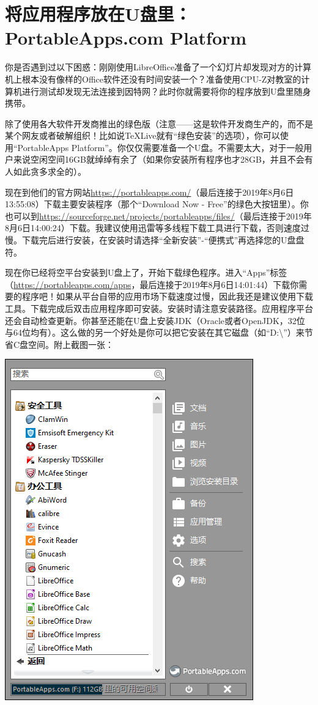 \section{将应用程序放在U盘里：PortableApps.com Platform}
你是否遇到过以下困惑：刚刚使用LibreOffice准备了一个幻灯片却发现对方的计算机上根本没有像样的Office软件还没有时间安装一个？准备使用CPU-Z对教室的计算机进行测试却发现无法连接到因特网？此时你就需要将你的程序放到U盘里随身携带。\par
除了使用各大软件开发商推出的绿色版（注意——这是软件开发商生产的，而不是某个网友或者破解组织！比如说TeXLive就有“绿色安装”的选项），你可以使用“PortableApps Platform”。你仅仅需要准备一个U盘。不需要太大，对于一般用户来说空闲空间16GB就绰绰有余了（如果你安装所有程序也才28GB，并且不会有人如此贪多求全的）。\par
现在到他们的官方网站\url{https://portableapps.com/}（最后连接于2019年8月6日13:55:08）下载主要安装程序（那个“Download Now - Free”的绿色大按钮里）。你也可以到\url{https://sourceforge.net/projects/portableapps/files/}（最后连接于2019年8月6日14:00:24）下载。我建议使用迅雷等多线程下载工具进行下载，否则速度过慢。下载完后进行安装，在安装时请选择“全新安装”-“便携式”再选择您的U盘盘符。\par
现在你已经将空平台安装到U盘上了，开始下载绿色程序。进入“Apps”标签（\url{https://portableapps.com/apps}，最后连接于2019年8月6日14:01:44）下载你需要的程序吧！如果从平台自带的应用市场下载速度过慢，因此我还是建议使用下载工具。下载完成后双击应用程序即可安装。安装时请注意安装路径。应用程序平台还会自动检查更新。你甚至还能在U盘上安装JDK（Oracle或者OpenJDK，32位与64位均有）。这么做的另一个好处是你可以把它安装在其它磁盘（如“D:\textbackslash”）来节省C盘空间。附上截图一张：
\begin{center}
	\includegraphics[scale=0.8]{pic/pap}
\end{center}